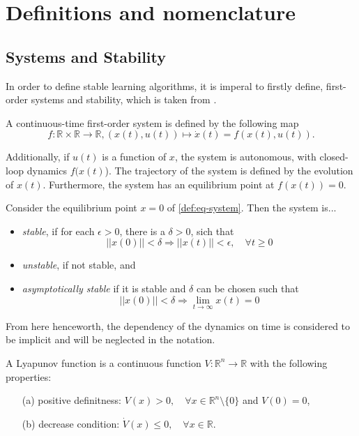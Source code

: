 \section{Definitions and nomenclature}

\subsection{Systems and Stability}
In order to define stable learning algorithms, it is imperal to firstly define, first-order systems and stability, which is taken from \cite{khalilNonlinearSystems1996}.

\begin{definition}
    A continuous-time first-order system is defined by the following map
    \begin{equation}
        f:\mathbb{R}\times\mathbb{R}\rightarrow \mathbb{R}, (x(t),u(t)) \mapsto \dot x(t) = f(x(t),u(t)).
        \label{def:eq-system}
    \end{equation}

    Additionally, if $u(t)$ is a function of $x$, the system is autonomous, with closed-loop dynamics $f(x(t)$). The trajectory of the system is defined by the evolution of $x(t)$. Furthermore, the system has an equilibrium point at $f(x(t))=0$.
    \label{def:system}
\end{definition}

\begin{definition}[Stability]
    Consider the equilibrium point $x=0$ of \eqref{def:eq-system}. Then the system is... 
    \begin{itemize}
        \item \textit{stable}, if for each $\epsilon>0$, there is a $\delta>0$, sich that
            $$||x(0)||<\delta \Rightarrow ||x(t)||<\epsilon, \quad \forall t \geq 0$$ 
        \item \textit{unstable}, if not stable, and
        \item \textit{asymptotically stable} if it is stable and $\delta$ can be chosen such that
            $$||x(0)||<\delta \Rightarrow \lim_{t\rightarrow\infty} x(t)=0 $$
    \end{itemize} 
\end{definition}
From here henceworth, the dependency of the dynamics on time is considered to be implicit and will be neglected in the notation.


\begin{definition}
    A Lyapunov function is a continuous function $V: \mathbb{R}^n\rightarrow\mathbb{R}$ with the following properties:
    \begin{enumerate}
        \item[(a)] positive definitness: $V(x)>0, \quad \forall x\in\mathbb{R}^n\setminus\{0\}$ and $V(0)=0$,
        \item[(b)] decrease condition: $\dot V(x)\leq0, \quad \forall x\in\mathbb{R}$.
    \end{enumerate}
\end{definition}

